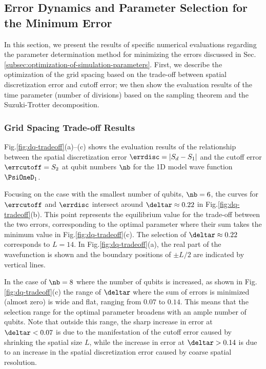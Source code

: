 \documentclass[manuscript_main.tex]{subfiles}
\begin{document}

\subsection{Error Dynamics and Parameter Selection for the Minimum Error}
\label{subsec:parameter-selection-for-minimum-error-results}
In this section, we present the results of specific numerical evaluations
regarding the parameter determination method for minimizing the errors discussed
in Sec. \ref{subsec:optimization-of-simulation-parameters}. First, we describe
the optimization of the grid spacing based on the trade-off between spatial
discretization error and cutoff error; we then show the evaluation results
of the time parameter (number of divisions) based on the sampling theorem and
the Suzuki-Trotter decomposition.

\subsubsection{Grid Spacing Trade-off Results}
\label{subsubsec:delta-r-selection-results}

Fig.\ref{fig:dq-tradeoff}(a)--(c) shows the evaluation results of the
relationship between the spatial discretization error $\errdisc = |S_d-S_1|$ and
the cutoff error $\errcutoff = S_2$ at qubit numbers $\nb$ for the 1D model wave
function $\PsiOneD_1$.

Focusing on the case with the smallest number of qubits, $\nb=6$, the curves for
$\errcutoff$ and $\errdisc$ intersect around $\deltar \approx 0.22$ in
Fig.\ref{fig:dq-tradeoff}(b). This point represents the equilibrium value for
the trade-off between the two errors, corresponding to the optimal parameter
where their sum takes the minimum value in Fig.\ref{fig:dq-tradeoff}(c). The
selection of $\deltar\approx0.22$ corresponds to $L=14$. In
Fig.\ref{fig:dq-tradeoff}(a), the real part of the wavefunction is shown and the
boundary positions of $\pm L/2$ are indicated by vertical lines.

In the case of $\nb=8$ where the number of qubits is increased, as shown in
Fig.\ref{fig:dq-tradeoff}(c) the range of $\deltar$ where the sum of errors is
minimized (almost zero) is wide and flat, ranging from $0.07$ to $0.14$. This
means that the selection range for the optimal parameter broadens with an ample
number of qubits. Note that outside this range, the sharp increase in error at
$\deltar < 0.07$ is due to the manifestation of the cutoff error caused by
shrinking the spatial size $L$, while the increase in error at $\deltar > 0.14$
is due to an increase in the spatial discretization error caused by coarse spatial
resolution.
\end{document}
